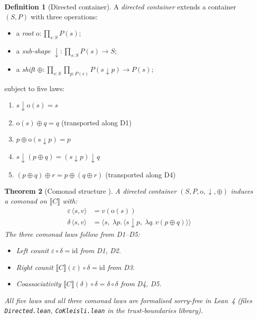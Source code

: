 \documentclass[11pt,a4paper]{article}
\theoremstyle{definition}
\newtheorem{definition}{Definition}[section]
\theoremstyle{plain}
\newtheorem{theorem}[definition]{Theorem}
\theoremstyle{remark}
\newcommand{\sub}{\mathop{\downarrow}}
\renewcommand{\root}{\mathrm{o}}
\begin{document}
\begin{definition}[Directed container]\label{def:dcont}
A \emph{directed container} extends a container $(S, P)$ with three
operations:
\begin{itemize}[nosep]
  \item a \emph{root} $\root : \prod_{s:S} P(s)$;
  \item a \emph{sub-shape} ${\sub} : \prod_{s:S} P(s) \to S$;
  \item a \emph{shift} $\oplus : \prod_{s:S} \prod_{p:P(s)} P(s \sub p) \to P(s)$;
\end{itemize}
subject to five laws:
\begin{enumerate}[label=\textbf{D\arabic*},nosep]
  \item $s \sub \root(s) = s$
  \item $\root(s) \oplus q = q$ \quad(transported along D1)
  \item $p \oplus \root(s \sub p) = p$
  \item $s \sub (p \oplus q) = (s \sub p) \sub q$
  \item $(p \oplus q) \oplus r = p \oplus (q \oplus r)$ \quad(transported along D4)
\end{enumerate}
\end{definition}

\begin{theorem}[Comonad structure {\cite{acu}}]\label{thm:comonad}
A directed container $(S, P, \root, {\sub}, \oplus)$ induces a comonad
on $\llbracket C \rrbracket$ with:
\begin{align*}
  \varepsilon\,\langle s, v \rangle &= v(\root(s)) \\
  \delta\,\langle s, v \rangle &= \langle s,\; \lambda p.\, \langle s \sub p,\; \lambda q.\, v(p \oplus q) \rangle \rangle
\end{align*}
The three comonad laws follow from D1--D5:
\begin{itemize}[nosep]
  \item Left counit $\varepsilon \circ \delta = \mathrm{id}$ from D1, D2.
  \item Right counit $\llbracket C \rrbracket(\varepsilon) \circ \delta = \mathrm{id}$ from D3.
  \item Coassociativity $\llbracket C \rrbracket(\delta) \circ \delta = \delta \circ \delta$ from D4, D5.
\end{itemize}
All five laws and all three comonad laws are formalised sorry-free in
Lean~4 (files \texttt{Directed.lean}, \texttt{CoKleisli.lean} in the
trust-boundaries library).
\end{theorem}
\end{document}
